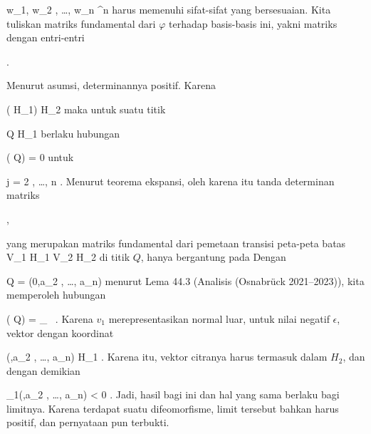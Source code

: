 {\mavergleichskette
{\vergleichskette
{ w_1, w_2 , \ldots , w_n
}
{ \in }{ \R^n
}
{  }{
}
{    }{
}
{   }{
}
}
{}{}{}
harus memenuhi sifat-sifat yang bersesuaian. Kita tuliskan matriks fundamental dari $\varphi$ terhadap basis-basis ini, yakni matriks dengan entri-entri

 { . }

Menurut asumsi, determinannya positif. Karena

\mavergleichskette
{\vergleichskette
{ \varphi ( \partial H_1)
}
{ \subseteq }{ \partial H_2
}
{  }{
}
{    }{
}
{   }{
}
}
{}{}{}
maka untuk suatu titik

\mavergleichskette
{\vergleichskette
{ Q
}
{ \in }{ \partial H_1
}
{  }{
}
{    }{
}
{   }{
}
}
{}{}{}
berlaku hubungan

\mavergleichskettedisp
{\vergleichskette
{ {  } ( Q)
}
{ =} { 0
}
{ } {
}
{ } {
}
{ } {
}
}
{}{}{}
untuk

\mavergleichskette
{\vergleichskette
{ j
}
{ = }{ 2 , \ldots , n
}
{  }{
}
{    }{
}
{   }{
}
}
{}{}{.}
Menurut
teorema ekspansi,
oleh karena itu tanda determinan matriks

 { , }

yang merupakan matriks fundamental dari pemetaan transisi peta-peta batas
\maabbdisp {} {V_1 \cap \partial H_1 } { V_2 \cap \partial H_2
} {}
 {} {}
di titik $Q$, hanya bergantung pada
 Dengan

\mavergleichskette
{\vergleichskette
{ Q
}
{ = }{ (0,a_2 , \ldots , a_n)
}
{  }{
}
{    }{
}
{   }{
}
}
{}{}{}
menurut
Lema 44.3 (Analisis (Osnabrück 2021--2023)),
kita memperoleh hubungan

\mavergleichskettedisp
{\vergleichskette
{ {  } ( Q)
}
{ =} { _{   \epsilon {}   } \,  {  }
}
{ } {
}
{ } {
}
{ } {
}
}
{}{}{.}
Karena $v_1$ merepresentasikan normal luar, untuk nilai negatif
 {} {}
$\epsilon$, vektor dengan koordinat

\mavergleichskette
{\vergleichskette
{ (\epsilon,a_2 , \ldots , a_n)
}
{ \in }{ H_1
}
{  }{
}
{    }{
}
{   }{
}
}
{}{}{.}
Karena itu, vektor citranya harus termasuk dalam $H_2$, dan dengan demikian

\mavergleichskette
{\vergleichskette
{ \varphi_1(\epsilon,a_2 , \ldots , a_n)
}
{ < }{ 0
}
{  }{
}
{    }{
}
{   }{
}
}
{}{}{.}
Jadi, hasil bagi ini
 dan hal yang sama berlaku bagi limitnya. Karena terdapat suatu difeomorfisme, limit tersebut bahkan harus positif, dan pernyataan pun terbukti.

}

